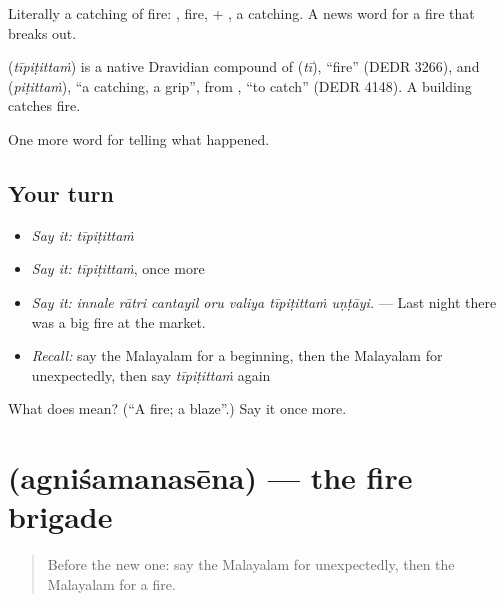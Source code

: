 Literally a catching of fire: , fire, + , a catching. A news word for a fire that breaks out.

\begin{cousinweb}
\textbf{} (\emph{tīpiṭittaṁ}) is a native Dravidian compound of  (\emph{tī}), \textquotedblleft{}fire\textquotedblright{} (DEDR 3266), and  (\emph{piṭittaṁ}), \textquotedblleft{}a catching, a grip\textquotedblright{}, from , \textquotedblleft{}to catch\textquotedblright{} (DEDR 4148). A building catches fire.
\end{cousinweb}

\begin{grammarlens}[title={What you've built}]
One more word for telling what happened.
\end{grammarlens}

\subsection*{Your turn}
\begin{itemize}
\raggedright
  \item \emph{Say it:} \emph{tīpiṭittaṁ}
  \item \emph{Say it:} \emph{tīpiṭittaṁ}, once more
  \item \emph{Say it:} \emph{innale rātri cantayil oru valiya tīpiṭittaṁ uṇṭāyi.} — Last night there was a big fire at the market.
  \item \emph{Recall:} say the Malayalam for a beginning, then the Malayalam for unexpectedly, then say \emph{tīpiṭittaṁ} again
\end{itemize}

\begin{tcolorbox}[breakable,colback=teal!4,colframe=teal!35!black,title={Before you move on}]
What does  mean? (\textquotedblleft{}A fire; a blaze\textquotedblright{}.) Say it once more.
\end{tcolorbox}
\section[\texorpdfstring{\ml{അഗ്നിശമനസേന} (agniśamanasēna)}{അഗ്നിശമനസേന (agniśamanasēna)}]{ (agniśamanasēna) — the fire brigade}

\label{lesson:ML-C362-agnisamanasena}



\begin{quote}
Before the new one: say the Malayalam for unexpectedly, then the Malayalam for a fire.
\end{quote}

